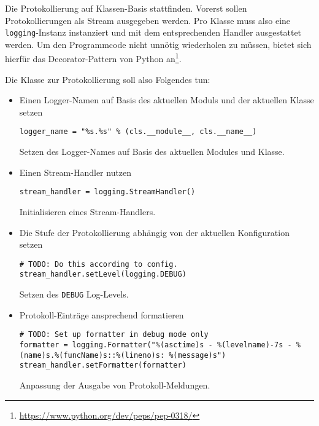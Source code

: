 \documentclass[10pt, openright, notitlepage]{scrreprt}
\begin{document}
Die Protokollierung auf Klassen-Basis stattfinden. Vorerst sollen
Protokollierungen als Stream ausgegeben werden. Pro Klasse muss also eine
\texttt{logging}-Instanz instanziert und mit dem entsprechenden Handler ausgestattet
werden. Um den Programmcode nicht unnötig wiederholen zu müssen, bietet sich
hierfür das Decorator-Pattern von Python
an\footnote{\url{https://www.python.org/dev/peps/pep-0318/}}.

Die Klasse zur Protokollierung soll also Folgendes tun:

\begin{itemize}
\item Einen Logger-Namen auf Basis des aktuellen Moduls und der aktuellen Klasse setzen
\begin{listing}[H]
\begin{verbatim}
logger_name = "%s.%s" % (cls.__module__, cls.__name__)
\end{verbatim}
\caption{\label{org187da4e}
Setzen des Logger-Names auf Basis des aktuellen Modules und Klasse.}
\end{listing}

\item Einen Stream-Handler nutzen
\begin{listing}[H]
\begin{verbatim}
stream_handler = logging.StreamHandler()
\end{verbatim}
\caption{\label{orgfc783ca}
Initialisieren eines Stream-Handlers.}
\end{listing}

\item Die Stufe der Protokollierung abhängig von der aktuellen Konfiguration setzen
\begin{listing}[H]
\begin{verbatim}
# TODO: Do this according to config.
stream_handler.setLevel(logging.DEBUG)
\end{verbatim}
\caption{\label{orgaf37712}
Setzen des \texttt{DEBUG} Log-Levels.}
\end{listing}

\item Protokoll-Einträge ansprechend formatieren
\begin{listing}[H]
\begin{verbatim}
# TODO: Set up formatter in debug mode only
formatter = logging.Formatter("%(asctime)s - %(levelname)-7s - %(name)s.%(funcName)s::%(lineno)s: %(message)s")
stream_handler.setFormatter(formatter)
\end{verbatim}
\caption{\label{org5f2e3ea}
Anpassung der Ausgabe von Protokoll-Meldungen.}
\end{listing}


\end{itemize}
\end{document}
